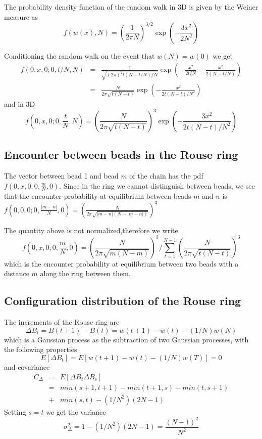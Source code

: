 \documentclass{paper}
\begin{document}
The probability density function of the random walk in 3D is given by the Weiner measure as  
\begin{equation*}
f(w(x),N)=\left( \frac{1}{2\pi N}\right)^{3/2}\exp(-\frac{3x^2}{2N^2})
\end{equation*}

Conditioning the random walk on the event that $w(N)=w(0)$ we get 
\begin{eqnarray*}
f(0,x,0;0,t/N,N)&=&\frac{1}{\sqrt{(2\pi)^2 t(N-t/N)/N}}\exp(-\frac{x^2}{2t/N}-\frac{x^2}{2(N-t/N)})\\
&=&\frac{N}{2\pi\sqrt{t(N-t)}} \exp(-\frac{x^2}{2t(N-t)/N^2})
\end{eqnarray*}
and in 3D
\begin{equation*}
f(0,x,0;0,\frac{t}{N},N) = \left(\frac{N}{2\pi\sqrt{t(N-t)}}\right)^3 \exp(-\frac{3x^2}{2t(N-t)/N^2})
\end{equation*}

\subsection{Encounter between beads in the Rouse ring}\label{subsection_encounterBetweenBeadsInTheRing}
The vector between bead 1 and bead $m$ of the chain has the pdf 
$f(0,x,0;0,\frac{m}{N},0)$. Since in the ring we cannot distinguish between beads, we see that the encounter probability at equilibrium between beads $m$ and $n$ is 
$f(0,0,0;0,\frac{|m-n|}{N},0)=\left(\frac{N}{2\pi \sqrt{|m-n|(N-|m-n|)}}\right)^3$

The quantity above is not normalized,therefore we write 
\begin{equation*}
f(0,x,0;0,\frac{m}{N},0)=\left(\frac{N}{2\pi\sqrt{m(N-m)}}\right)^3 /\sum_{t=1}^{N-1}\left(\frac{N}{2\pi\sqrt{t(N-t)}}\right)^3 
\end{equation*}
which is the encounter probability at equilibrium between two beads with a distance $m$ along the ring between them. 

\subsection{Configuration distribution of the Rouse ring}\label{subsection_configurationDistributionRouseRing}

The increments of the Rouse ring are
\begin{equation*}
\Delta B_t= B(t+1)-B(t)=w(t+1)-w(t)-(1/N)w(N)
\end{equation*}
which is a Gaussian process as the subtraction of two Gaussian processes, with the following properties
\begin{equation*}
E[\Delta B_t]=E[w(t+1)-w(t)-(1/N)w(T)]=0
\end{equation*}
and covariance
 \begin{eqnarray*}
 C_{\Delta} & = & E[\Delta B_t \Delta B_s]\\
  & = & min(s+1,t+1)-min(t+1,s)-min(t,s+1)\\
  &+ & min(s,t)-(1/N^2)(2N-1)
 \end{eqnarray*}
Setting $s=t $ we get the variance 
\begin{equation*}
\sigma^2_{\Delta}=1-(1/N^2)(2N-1)=\frac{(N-1)^2}{N^2}
\end{equation*}
\end{document}
